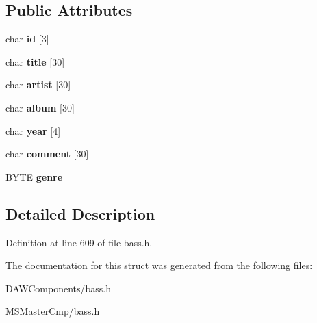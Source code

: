 \subsection*{Public Attributes}
\begin{DoxyCompactItemize}
\item 
\hypertarget{struct_t_a_g___i_d3_acffd35f6f754060dc8b467b6d11c8068_acffd35f6f754060dc8b467b6d11c8068}{char {\bfseries id} \mbox{[}3\mbox{]}}\label{struct_t_a_g___i_d3_acffd35f6f754060dc8b467b6d11c8068_acffd35f6f754060dc8b467b6d11c8068}

\item 
\hypertarget{struct_t_a_g___i_d3_a18676a1bba83004481aa6a11d3d49dc5_a18676a1bba83004481aa6a11d3d49dc5}{char {\bfseries title} \mbox{[}30\mbox{]}}\label{struct_t_a_g___i_d3_a18676a1bba83004481aa6a11d3d49dc5_a18676a1bba83004481aa6a11d3d49dc5}

\item 
\hypertarget{struct_t_a_g___i_d3_a2bb38e8cc712fea72edc5678e8b7fc64_a2bb38e8cc712fea72edc5678e8b7fc64}{char {\bfseries artist} \mbox{[}30\mbox{]}}\label{struct_t_a_g___i_d3_a2bb38e8cc712fea72edc5678e8b7fc64_a2bb38e8cc712fea72edc5678e8b7fc64}

\item 
\hypertarget{struct_t_a_g___i_d3_a24dd09e6778d26698854747ac1cce0b9_a24dd09e6778d26698854747ac1cce0b9}{char {\bfseries album} \mbox{[}30\mbox{]}}\label{struct_t_a_g___i_d3_a24dd09e6778d26698854747ac1cce0b9_a24dd09e6778d26698854747ac1cce0b9}

\item 
\hypertarget{struct_t_a_g___i_d3_a1792effd9f4ea0bb1bd2cbca42859512_a1792effd9f4ea0bb1bd2cbca42859512}{char {\bfseries year} \mbox{[}4\mbox{]}}\label{struct_t_a_g___i_d3_a1792effd9f4ea0bb1bd2cbca42859512_a1792effd9f4ea0bb1bd2cbca42859512}

\item 
\hypertarget{struct_t_a_g___i_d3_acbd96db32112f3afb5c5b350e8005d9d_acbd96db32112f3afb5c5b350e8005d9d}{char {\bfseries comment} \mbox{[}30\mbox{]}}\label{struct_t_a_g___i_d3_acbd96db32112f3afb5c5b350e8005d9d_acbd96db32112f3afb5c5b350e8005d9d}

\item 
\hypertarget{struct_t_a_g___i_d3_af7a5412ae2d2acafd300dca3212dbbc2_af7a5412ae2d2acafd300dca3212dbbc2}{B\-Y\-T\-E {\bfseries genre}}\label{struct_t_a_g___i_d3_af7a5412ae2d2acafd300dca3212dbbc2_af7a5412ae2d2acafd300dca3212dbbc2}

\end{DoxyCompactItemize}


\subsection{Detailed Description}


Definition at line 609 of file bass.\-h.



The documentation for this struct was generated from the following files\-:\begin{DoxyCompactItemize}
\item 
D\-A\-W\-Components/bass.\-h\item 
M\-S\-Master\-Cmp/bass.\-h\end{DoxyCompactItemize}
